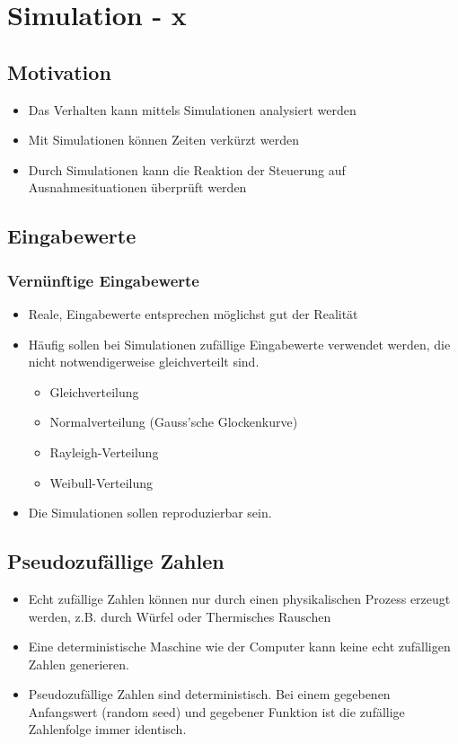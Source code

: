 \section{Simulation - x}

\subsection{Motivation}
\begin{itemize}
	\item Das Verhalten kann mittels Simulationen analysiert werden
	\item Mit Simulationen können Zeiten verkürzt werden
	\item Durch Simulationen kann die Reaktion der Steuerung auf Ausnahmesituationen überprüft werden
\end{itemize}

\subsection{Eingabewerte}
\subsubsection{Vernünftige Eingabewerte}
\begin{itemize}
	\item Reale, Eingabewerte entsprechen möglichst gut der Realität
	\item Häufig sollen bei Simulationen zufällige Eingabewerte verwendet werden, die nicht notwendigerweise gleichverteilt sind.
	\begin{itemize}
		\item Gleichverteilung
		\item Normalverteilung (Gauss'sche Glockenkurve)
		\item Rayleigh-Verteilung
		\item Weibull-Verteilung
	\end{itemize}
	\item Die Simulationen sollen reproduzierbar sein.
\end{itemize}

\subsection{Pseudozufällige Zahlen}
\begin{itemize}
	\item Echt zufällige Zahlen können nur durch einen physikalischen Prozess erzeugt werden, z.B. durch Würfel oder Thermisches Rauschen
	\item Eine deterministische Maschine wie der Computer kann keine echt zufälligen Zahlen generieren.
	\item Pseudozufällige Zahlen sind deterministisch. Bei einem gegebenen	Anfangswert (random seed) und gegebener Funktion ist die zufällige Zahlenfolge immer identisch.
\end{itemize}

